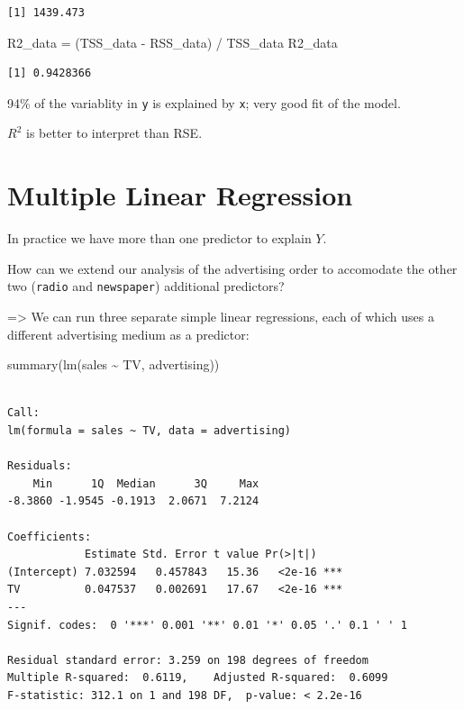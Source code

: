 \documentclass[
  letterpaper,
  DIV=11,
  numbers=noendperiod]{scrreprt}
\newenvironment{Shaded}{\begin{snugshade}}{\end{snugshade}}
\newcommand{\FunctionTok}[1]{\textcolor[rgb]{0.28,0.35,0.67}{#1}}
\newcommand{\NormalTok}[1]{\textcolor[rgb]{0.00,0.23,0.31}{#1}}
\newcommand{\OtherTok}[1]{\textcolor[rgb]{0.00,0.23,0.31}{#1}}
\newcommand{\SpecialCharTok}[1]{\textcolor[rgb]{0.37,0.37,0.37}{#1}}
\begin{document}
\begin{verbatim}
[1] 1439.473
\end{verbatim}

\begin{Shaded}
\begin{Highlighting}[]
\NormalTok{R2\_data }\OtherTok{=}\NormalTok{ (TSS\_data }\SpecialCharTok{{-}}\NormalTok{ RSS\_data) }\SpecialCharTok{/}\NormalTok{ TSS\_data}
\NormalTok{R2\_data}
\end{Highlighting}
\end{Shaded}

\begin{verbatim}
[1] 0.9428366
\end{verbatim}

94\% of the variablity in \texttt{y} is explained by \texttt{x}; very
good fit of the model.

\(R^2\) is better to interpret than RSE.

\hypertarget{multiple-linear-regression}{%
\section{Multiple Linear Regression}\label{multiple-linear-regression}}

In practice we have more than one predictor to explain \(Y\).

How can we extend our analysis of the advertising order to accomodate
the other two (\texttt{radio} and \texttt{newspaper}) additional
predictors?

=\textgreater{} We can run three separate simple linear regressions,
each of which uses a different advertising medium as a predictor:

\begin{Shaded}
\begin{Highlighting}[]
\FunctionTok{summary}\NormalTok{(}\FunctionTok{lm}\NormalTok{(sales }\SpecialCharTok{\textasciitilde{}}\NormalTok{ TV, advertising))}
\end{Highlighting}
\end{Shaded}

\begin{verbatim}

Call:
lm(formula = sales ~ TV, data = advertising)

Residuals:
    Min      1Q  Median      3Q     Max 
-8.3860 -1.9545 -0.1913  2.0671  7.2124 

Coefficients:
            Estimate Std. Error t value Pr(>|t|)    
(Intercept) 7.032594   0.457843   15.36   <2e-16 ***
TV          0.047537   0.002691   17.67   <2e-16 ***
---
Signif. codes:  0 '***' 0.001 '**' 0.01 '*' 0.05 '.' 0.1 ' ' 1

Residual standard error: 3.259 on 198 degrees of freedom
Multiple R-squared:  0.6119,    Adjusted R-squared:  0.6099 
F-statistic: 312.1 on 1 and 198 DF,  p-value: < 2.2e-16
\end{verbatim}
\end{document}
